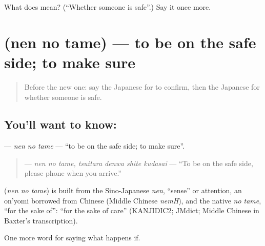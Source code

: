 \begin{tcolorbox}[breakable,colback=teal!4,colframe=teal!35!black,title={Before you move on}]
What does  mean? (\textquotedblleft{}Whether someone is safe\textquotedblright{}.) Say it once more.
\end{tcolorbox}
\section[\texorpdfstring{\ja{ねんのため} (nen no tame)}{ねんのため (nen no tame)}]{ (nen no tame) — to be on the safe side; to make sure}

\label{lesson:JA-C351-nen-no-tame}



\begin{quote}
Before the new one: say the Japanese for to confirm, then the Japanese for whether someone is safe.
\end{quote}

\subsection*{You'll want to know: }
\textbf{} — \emph{nen no tame} — \textquotedblleft{}to be on the safe side; to make sure\textquotedblright{}.

\begin{quote}
\textbf{  } — \emph{nen no tame, tsuitara denwa shite kudasai} — \textquotedblleft{}To be on the safe side, please phone when you arrive.\textquotedblright{}
\end{quote}

\begin{cousinweb}
\textbf{} (\emph{nen no tame}) is built from the Sino-Japanese \emph{nen}, \textquotedblleft{}sense\textquotedblright{} or attention, an on'yomi borrowed from Chinese (Middle Chinese \emph{nemH}), and the native \emph{no tame}, \textquotedblleft{}for the sake of\textquotedblright{}: \textquotedblleft{}for the sake of care\textquotedblright{} (KANJIDIC2; JMdict; Middle Chinese in Baxter's transcription).
\end{cousinweb}

\begin{grammarlens}[title={What you've built}]
One more word for saying what happens if.
\end{grammarlens}

